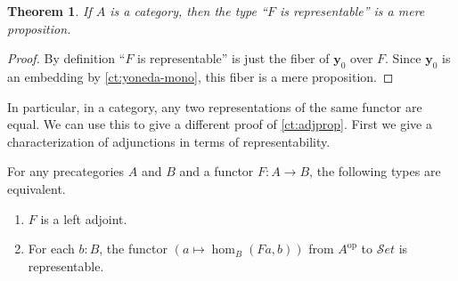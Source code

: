 \documentclass[10pt,a4paper]{article}
\providecommand{\index}[1]{}
\newcommand{\uset}{\ensuremath{\mathcal{S}et}\xspace}
\newcommand{\op}{^{\mathrm{op}}}
\newcommand{\y}{\ensuremath{\mathbf{y}}\xspace}
\newtheorem{thm}{Theorem}[section]
\theoremstyle{definition}
\theoremstyle{remark}
\numberwithin{equation}{section}
\begin{document}
\begin{thm}\label{ct:representable-prop}
  If $A$ is a category, then the type ``$F$ is representable'' is a mere proposition.
\end{thm}
\begin{proof}
  By definition ``$F$ is representable'' is just the fiber of $\y_0$ over $F$.
  Since $\y_0$ is an embedding by \cref{ct:yoneda-mono}, this fiber is a mere proposition.
\end{proof}

In particular, in a category, any two representations of the same functor are equal.
We can use this to give a different proof of \cref{ct:adjprop}.
First we give a characterization of adjunctions in terms of representability.

\begin{lem}\label{ct:adj-repr}
  For any precategories $A$ and $B$ and a functor $F:A\to B$, the following types are equivalent.
  \begin{enumerate}
  \item $F$ is a left adjoint\index{adjoint!functor}.\label{item:ct:ar1}
  \item For each $b:B$, the functor $(a \mapsto \hom_B(Fa,b))$ from $A\op$ to \uset is representable\index{representable functor}.\label{item:ct:ar2}
  \end{enumerate}
\end{lem}
\end{document}

